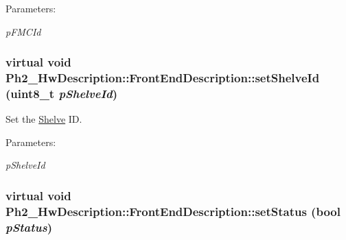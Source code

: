 \begin{Desc}
\item[Parameters:]
\begin{description}
\item[{\em p\-FMCId}]\end{description}
\end{Desc}
\hypertarget{class_ph2___hw_description_1_1_front_end_description_b876244bc12be6e5b622f57eccd61c0e}{
\subsubsection[setShelveId]{\setlength{\rightskip}{0pt plus 5cm}virtual void Ph2\_\-Hw\-Description::Front\-End\-Description::set\-Shelve\-Id (uint8\_\-t {\em p\-Shelve\-Id})}}
\label{class_ph2___hw_description_1_1_front_end_description_b876244bc12be6e5b622f57eccd61c0e}


Set the \hyperlink{class_ph2___hw_description_1_1_shelve}{Shelve} ID. 

\begin{Desc}
\item[Parameters:]
\begin{description}
\item[{\em p\-Shelve\-Id}]\end{description}
\end{Desc}
\hypertarget{class_ph2___hw_description_1_1_front_end_description_cd0db6c28f72c80079b22ed5da535a40}{
\subsubsection[setStatus]{\setlength{\rightskip}{0pt plus 5cm}virtual void Ph2\_\-Hw\-Description::Front\-End\-Description::set\-Status (bool {\em p\-Status})}}
\label{class_ph2___hw_description_1_1_front_end_description_cd0db6c28f72c80079b22ed5da535a40}


